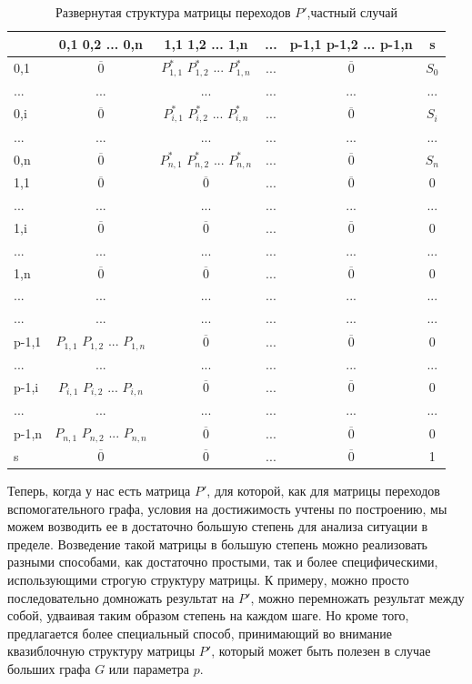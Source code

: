 \newpage 
\begin{table}[h]
	\centering
	\caption{Развернутая структура матрицы переходов $P'$,\newline частный случай}
	\begin{tabular}{l || c | c | c | c | c}
		& 0,1 0,2 ... 0,n & 1,1 1,2 ... 1,n & ... & p-1,1 p-1,2 ... p-1,n & s \\
		\hline \hline
		0,1 & $\overline 0$ & $P^*_{1,1}$ $P^*_{1,2}$ ... $P^*_{1,n}$ & ... & $\overline 0$ & $S_0$ \\
		... & ... & ... & ... & ... & ... \\
		0,i & $\overline 0$ & $P^*_{i,1}$ $P^*_{i,2}$ ... $P^*_{i,n}$ & ... & $\overline 0$ & $S_i$ \\
		... & ... & ... & ... & ... & ... \\
		0,n & $\overline 0$ & $P^*_{n,1}$ $P^*_{n,2}$ ... $P^*_{n,n}$ & ... & $\overline 0$ & $S_n$ \\
		\hline \hline
		1,1 & $\overline 0$ & $\overline 0$ & ... & $\overline 0$ & 0 \\
		... & ... & ... & ... & ... & ... \\
		1,i & $\overline 0$ & $\overline 0$ & ... & $\overline 0$ & 0 \\
		... & ... & ... & ... & ... & ... \\
		1,n & $\overline 0$ & $\overline 0$ & ... & $\overline 0$ & 0 \\
		\hline \hline
		... & ... & ... & ... & ... & ... \\
		... & ... & ... & ... & ... & ... \\
		\hline \hline
		p-1,1  & $P_{1,1}$ $P_{1,2}$ ... $P_{1,n}$ & $\overline 0$ & ... & $\overline 0$ & 0 \\
		... & ... & ... & ... & ... & ... \\
		p-1,i & $P_{i,1}$ $P_{i,2}$ ... $P_{i,n}$ & $\overline 0$ & ... & $\overline 0$ & 0 \\
		... & ... & ... & ... & ... & ... \\
		p-1,n & $P_{n,1}$ $P_{n,2}$ ... $P_{n,n}$ & $\overline 0$ & ... & $\overline 0$ & 0 \\
		\hline \hline
		s  & $\overline 0$ & $\overline 0$ & ... & $\overline 0$ & 1 \\
	\end{tabular}
	\label{tabl:P'}
\end{table}

Теперь, когда у нас есть матрица $P'$, для которой, как для матрицы переходов вспомогательного графа, условия на достижимость учтены по построению, мы можем возводить ее в достаточно большую степень для анализа ситуации в пределе. Возведение такой матрицы в большую степень можно реализовать разными способами, как достаточно простыми, так и более специфическими, использующими строгую структуру матрицы. К примеру, можно просто последовательно домножать результат на $P'$, можно перемножать результат между собой, удваивая таким образом степень на каждом шаге. Но кроме того, предлагается более специальный способ, принимающий во внимание квазиблочную структуру матрицы $P'$, который может быть полезен в случае больших графа $G$ или параметра $p$.	

